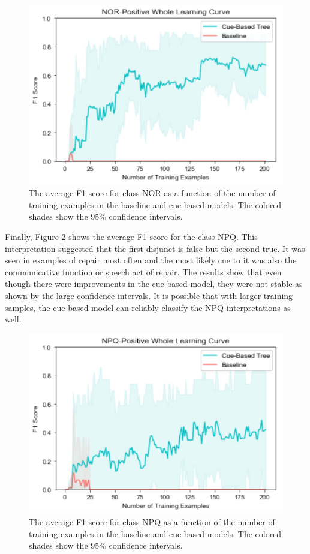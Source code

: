 \documentclass[floatsintext,man]{apa6}
\theoremstyle{definition}
\theoremstyle{definition}
\theoremstyle{definition}
\theoremstyle{remark}
\begin{document}
\begin{figure}
\centering
\includegraphics{figs/NORWhole-1.pdf}
\caption{\label{fig:NORWhole}The average F1 score for class NOR as a
function of the number of training examples in the baseline and
cue-based models. The colored shades show the 95\% confidence
intervals.}
\end{figure}

Finally, Figure \ref{fig:NPQWhole} shows the average F1 score for the
class NPQ. This interpretation suggested that the first disjunct is
false but the second true. It was seen in examples of repair most often
and the most likely cue to it was also the communicative function or
speech act of repair. The results show that even though there were
improvements in the cue-based model, they were not stable as shown by
the large confidence intervals. It is possible that with larger training
samples, the cue-based model can reliably classify the NPQ
interpretations as well.

\begin{figure}
\centering
\includegraphics{figs/NPQWhole-1.pdf}
\caption{\label{fig:NPQWhole}The average F1 score for class NPQ as a
function of the number of training examples in the baseline and
cue-based models. The colored shades show the 95\% confidence
intervals.}
\end{figure}
\end{document}
